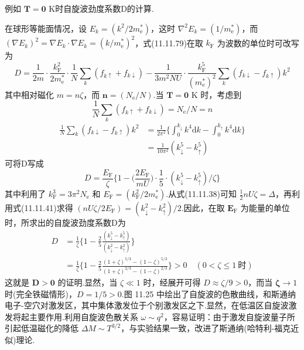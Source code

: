 例如 $\boldsymbol{T}=\boldsymbol{0}$ K时自旋波劲度系数D的计算.

在球形等能面情况，设 $E_{k}=(k^{2}/2m_{\mathrm{e}}^{*})$，这时 $\nabla^{2}E_{k}=(1/m_{\mathrm{e}}^{*})$，而 $(\nabla E_{k})^{2}=\nabla E_{k}\cdot\nabla E_{k}=(k/m_{\mathrm{e}}^{*})^{2}$，式(11.11.79)在取 $k_{\mathrm{F}}$ 为波数的单位时可改写为
\begin{equation*}
  D=\frac{1}{2m}\cdot\frac{k_{\mathrm{F}}^{2}}{2m_{\mathrm{e}}^{*}}\cdot\frac{1}{N}\sum_{k}(f_{k\uparrow}+f_{k\downarrow})
  -\frac{1}{3m^{2}NU}\cdot\frac{k_{\mathrm{F}}^{5}}{(m_{\mathrm{e}}^{*})^{2}}\sum_{k}(f_{k\downarrow}-f_{k\uparrow})k^{2}
\end{equation*}
其中相对磁化 $m=n\zeta$，而 $\boldsymbol{n}=(N_{\mathrm{e}}/N)$.当 $\boldsymbol{T}=\boldsymbol{0}$ K 时，考虑到
\begin{equation*}
  \frac{1}{N}\sum_{k}(f_{k\uparrow}+f_{k\downarrow})=N_{\mathrm{e}}/N=n
\end{equation*}
\begin{equation*}
\begin{aligned}
  \frac{1}{N}\sum_{k}(f_{k\downarrow}-f_{k\uparrow})k^{2}
  &=\frac{1}{2\pi^{2}}\biggl\{\int_{0}^{k_{\downarrow}}k^{4}\mathrm{d}k-\int_{0}^{k_{\uparrow}}k^{4}\mathrm{d}k\biggr\}\\
  &=\frac{1}{10\pi^{2}}(k_{\downarrow}^{5}-k_{\uparrow}^{5})
\end{aligned}
\end{equation*}
可将D写成
\begin{equation*}
  D=\frac{E_{\mathrm{F}}}{\zeta}\biggl\{1-\biggl(\frac{2E_{\mathrm{F}}}{mU}\biggr)\cdot\frac{1}{5}\cdot(k_{\downarrow}^{5}-k_{\uparrow}^{5})/\zeta\biggr\}
\end{equation*}
其中利用了 $k_{\mathrm{F}}^{3}=3\pi^{2}N_{\mathrm{e}}$ 和 $E_{\mathrm{F}}=(k_{\mathrm{F}}^{2}/2m_{\mathrm{e}}^{*})$.从式(11.11.38)可知 $\frac{1}{2}nU\zeta=\Delta$，再利用式(11.11.41)求得 $(nU\zeta/2E_{\mathrm{F}})=(k_{\downarrow}^{2}-k_{\uparrow}^{2})/2$.因此，在取 $\boldsymbol{E}_{\mathrm{F}}$ 为能量的单位时，所求出的自旋波劲度系数D为
\begin{equation*}
\begin{aligned}
  D&=\frac{1}{\zeta}\biggl\{1-\frac{2}{5}\frac{(k_{\downarrow}^{5}-k_{\uparrow}^{5})}{(k_{\downarrow}^{2}-k_{\uparrow}^{2})}\biggr\}\\
  &=\frac{1}{\zeta}\biggl\{1-\frac{2}{5}\frac{(1+\zeta)^{5/3}-(1-\zeta)^{5/3}}{(1+\zeta)^{2/3}-(1-\zeta)^{2/3}}\biggr\}>0
  \quad(0<\zeta\leqslant 1\ \text{时})
\end{aligned}
\end{equation*}
这就是 $\boldsymbol{D}>\boldsymbol{0}$ 的证明.显然，当 $\zeta\ll 1$ 时，经展开可得 $D\approx\zeta/9>0$，而当 $\boldsymbol{\zeta}\to 1$ 时(完全铁磁情形)，$D=1/5>0$.图 11.25 中绘出了自旋波的色散曲线，和斯通纳电子-空穴对激发区，其中集体激发位于个别激发区之下.显然，在低温区自旋波激发将起主要作用.利用自旋波色散关系 $\omega\sim q^{2}$，容易证明：由于激发自旋波量子所引起低温磁化的降低 $\Delta M\sim T^{3/2}$，与实验结果一致，改进了斯通纳(哈特利-福克近似)理论.

